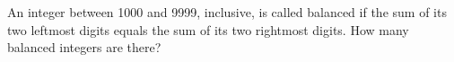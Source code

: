 An integer between 1000 and 9999, inclusive, is called balanced if the sum of its two leftmost digits equals the sum of its two rightmost digits.  How many balanced integers are there?